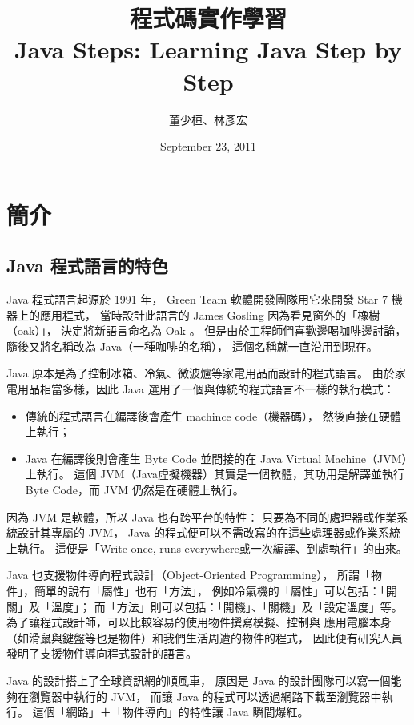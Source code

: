 \documentclass[a4paper,12pt,english]{sphinxmanual}
\title{程式碼實作學習\\Java Steps: Learning Java Step by Step}
\date{September 23, 2011}
\author{董少桓、林彥宏}
\begin{document}
\maketitle
\tableofcontents
{}\label{index::doc}



\chapter{簡介}
\label{java_intro::doc}\label{java_intro:java-steps}\label{java_intro:id1}

\section{Java 程式語言的特色}
\label{java_intro:java}
Java 程式語言起源於 1991 年，
Green Team 軟體開發團隊用它來開發 Star 7 機器上的應用程式，
當時設計此語言的 James Gosling 因為看見窗外的「橡樹（oak）」，
決定將新語言命名為 Oak 。
但是由於工程師們喜歡邊喝咖啡邊討論，
隨後又將名稱改為 Java（一種咖啡的名稱），
這個名稱就一直沿用到現在。

Java 原本是為了控制冰箱、冷氣、微波爐等家電用品而設計的程式語言。
由於家電用品相當多樣，因此 Java 選用了一個與傳統的程式語言不一樣的執行模式：
\begin{itemize}
\item {} 
傳統的程式語言在編譯後會產生 machince code（機器碼），
然後直接在硬體上執行；

\item {} 
Java 在編譯後則會產生 Byte Code 並間接的在 Java Virtual Machine（JVM）上執行。
這個 JVM（Java虛擬機器）其實是一個軟體，其功用是解譯並執行 Byte Code，而 JVM 仍然是在硬體上執行。

\end{itemize}

因為 JVM 是軟體，所以 Java 也有跨平台的特性：
只要為不同的處理器或作業系統設計其專屬的 JVM，
Java 的程式便可以不需改寫的在這些處理器或作業系統上執行。
這便是「Write once, runs everywhere或一次編譯、到處執行」的由來。

Java 也支援物件導向程式設計（Object-Oriented Programming），
所謂「物件」，簡單的說有「屬性」也有「方法」，
例如冷氣機的「屬性」可以包括：「開關」及「溫度」；
而「方法」則可以包括：「開機」、「關機」及「設定溫度」等。
為了讓程式設計師，可以比較容易的使用物件撰寫模擬、控制與
應用電腦本身（如滑鼠與鍵盤等也是物件）和我們生活周遭的物件的程式，
因此便有研究人員發明了支援物件導向程式設計的語言。

Java 的設計搭上了全球資訊網的順風車，
原因是 Java 的設計團隊可以寫一個能夠在瀏覽器中執行的 JVM，
而讓 Java 的程式可以透過網路下載至瀏覽器中執行。
這個「網路」＋「物件導向」的特性讓 Java 瞬間爆紅。
\end{document}
